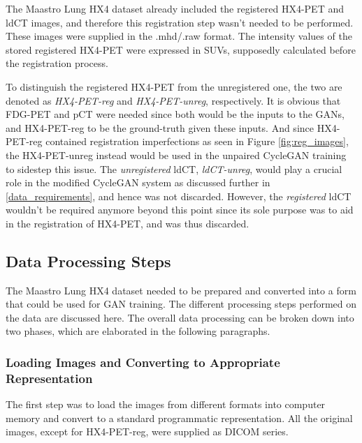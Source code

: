 The Maastro Lung HX4 dataset already included the registered HX4-PET and ldCT images, and therefore this registration step wasn't needed to be performed. These images were supplied in the .mhd/.raw format. The intensity values of the stored registered HX4-PET were expressed in SUVs, supposedly calculated before the registration process. 

To distinguish the registered HX4-PET from the unregistered one, the two are denoted as \textit{HX4-PET-reg} and \textit{HX4-PET-unreg}, respectively. It is obvious that FDG-PET and pCT were needed since both would be the inputs to the GANs, and HX4-PET-reg to be the ground-truth given these inputs. And since HX4-PET-reg contained registration imperfections as seen in Figure \ref{fig:reg_images}, the HX4-PET-unreg instead would be used in the unpaired CycleGAN training to sidestep this issue. The \textit{unregistered} ldCT, \textit{ldCT-unreg}, would play a crucial role in the modified CycleGAN system as discussed further in \ref{data_requirements}, and hence was not discarded. However, the \textit{registered} ldCT wouldn't be required anymore beyond this point since its sole purpose was to aid in the registration of HX4-PET, and was thus discarded.


\subsection{Data Processing Steps}
\label{Data_Processing}
The Maastro Lung HX4 dataset needed to be prepared and converted into a form that could be used for GAN training. The different processing steps performed on the data are discussed here. The overall data processing can be broken down into two phases, which are elaborated in the following paragraphs. 

\subsubsection{Loading Images and Converting to Appropriate Representation}
The first step was to load the images from different formats into computer memory and convert to a standard programmatic representation. All the original images, except for HX4-PET-reg, were supplied as DICOM series. 

